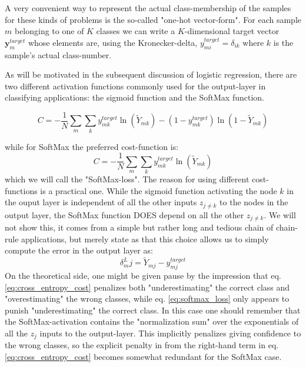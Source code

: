 \documentclass[reprint, english, nofootinbib]{revtex4-2}
\begin{document}
A very convenient way to represent the actual class-membership of the samples for these kinds of problems is the so-called "one-hot vector-form". For each sample $m$ belonging to one of $K$ classes we can write a $K$-dimensional target vector $\mathbf{y}_m^{target}$ whose elements are, using the Kronecker-delta, $y^{target}_{mi} = \delta_{ik}$ where $k$ is the sample's actual class-number.

As will be motivated in the subsequent discussion of logistic regression, there are two different activation functions commonly used for the output-layer in classifying applications: the sigmoid function and the SoftMax function.

\begin{equation}
\label{eq:cross_entropy_cost}
C= - \frac{1}{N} \sum_m \sum_k y^{target}_{mk}  \ln (\tilde{Y}_{mk}) - (1-y^{target}_{mk})  \ln (1- \tilde{Y}_{mk})
\end{equation}

while for SoftMax the preferred cost-function is:
\begin{equation}
\label{eq:softmax_loss}
C= - \frac{1}{N} \sum_m \sum_k y^{target}_{mk}  \ln (\tilde{Y}_{mk})
\end{equation}
which we will call the "SoftMax-loss". The reason for using different cost-functions is a practical one. While the sigmoid function activating the node $k$ in the ouput layer is independent of all the other inputs $z_{j\neq k}$ to the nodes in the output layer, the SoftMax function DOES depend on all the other $z_{j\neq k}$. We will not show this, it comes from a simple but rather long and tedious chain of chain-rule applications, but merely state as \cite{Nielsen} that this choice allows us to simply compute the error in the output layer as:
\begin{equation}
\label{eq:output_error_nn_classifier}
\delta^L_mj = \tilde{Y}_{mj} - y^{target}_{mj}
\end{equation}
On the theoretical side, one might be given pause by the impression that eq. \ref{eq:cross_entropy_cost} penalizes both "underestimating" the correct class and "overestimating" the wrong classes, while eq. \ref{eq:softmax_loss} only appears to punish "underestimating" the correct class. In this case one should remember that the SoftMax-activation contains the "normalization sum" over the exponentials of all the $z_j$ inputs to the output-layer. This implicitly penalizes giving confidence to the wrong classes, so the explicit penalty in from the right-hand term in eq.\ref{eq:cross_entropy_cost} becomes somewhat redundant for the SoftMax case.
\end{document}
